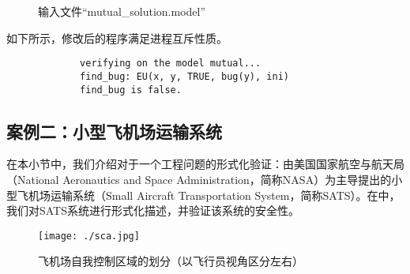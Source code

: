 \begin{example}
\begin{figure}[h!]
\begin{boxedverbatim}
		\end{boxedverbatim}
		\caption{输入文件“mutual\_solution.model”}
		\label{fig:mutual:solution}
	\end{figure}
	
	如下所示，修改后的程序满足进程互斥性质。
	\begin{center}
		\small
		\begin{verbatim}
             verifying on the model mutual...
             find_bug: EU(x, y, TRUE, bug(y), ini)
             find_bug is false.
		\end{verbatim}
	\end{center}
\end{example}

\subsection{案例二：小型飞机场运输系统}
在本小节中，我们介绍对于一个工程问题的形式化验证：由美国国家航空与航天局（National Aeronautics and Space Administration，简称NASA）为主导提出的小型飞机场运输系统（Small Aircraft Transportation System，简称SATS）\cite{MunozDC04,nasasats04}。在\sctlprov{}中，我们对SATS系统进行形式化描述，并验证该系统的安全性。



\begin{figure}
	\centering
	\texttt{[image: ./sca.jpg]}
	\caption{飞机场自我控制区域的划分（以飞行员视角区分左右）}
	\label{fig:example:sats:sca}
\end{figure}

